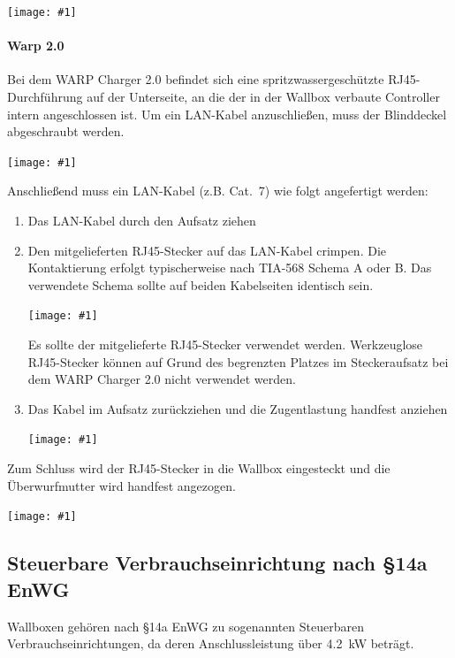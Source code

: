 \documentclass[a4paper,10pt]{article}
\newcommand{\hint}[1]{\begin{tcolorbox}[colback=boxgray,colframe=black,coltext=
white,title=Hinweis,left*=2mm,right*=2mm,boxsep=1mm,bottom=1mm,top=1mm]#1\end{tcolorbox}}
\newcommand{\gfx}[1]{\texttt{[image: \#1]}}
\begin{document}
\begin{multicols*}{2}
    \gfx{./img_warp2/resized/warp2_1_top_ready_1000.jpg} %

    \paragraph{Warp 2.0}

    Bei dem WARP Charger 2.0 befindet sich eine spritzwassergeschützte
    RJ45-Durchführung auf der Unterseite, an die der in der Wallbox verbaute Controller intern
    angeschlossen ist. Um ein LAN-Kabel anzuschließen, muss der Blinddeckel
    abgeschraubt werden.

    \gfx{./img_warp2/resized/warp2_ethernet3_circle_600} %

    Anschließend muss ein LAN-Kabel (z.B. Cat.~7) wie folgt
    angefertigt werden:

    \columnbreak

    \begin{enumerate}
        \item Das LAN-Kabel durch den Aufsatz ziehen
        \item Den mitgelieferten RJ45-Stecker auf das LAN-Kabel crimpen. Die
        Kontaktierung erfolgt typischerweise nach TIA-568 Schema A oder B.
        Das verwendete Schema sollte auf beiden Kabelseiten identisch sein.

        \gfx{./img_warp2/resized/warp2_rj45_1_600}
        \hint{Es sollte der mitgelieferte RJ45-Stecker verwendet werden. Werkzeuglose RJ45-Stecker können auf Grund des begrenzten
        Platzes im Steckeraufsatz bei dem WARP Charger 2.0 nicht verwendet werden.}

        \item Das Kabel im Aufsatz zurückziehen und die Zugentlastung handfest anziehen

        \gfx{./img_warp2/resized/warp2_rj45_2_600}
    \end{enumerate}

    Zum Schluss wird der RJ45-Stecker in die Wallbox eingesteckt und die Überwurfmutter
    wird handfest angezogen.

    \gfx{./img_warp2/resized/warp2_ethernet4_600} %

    \subsection{Steuerbare Verbrauchseinrichtung nach \S14a EnWG}
    Wallboxen gehören nach \S14a EnWG zu sogenannten Steuerbaren
    Verbrauchseinrichtungen, da deren Anschlussleistung über \SI{4,2}{\kilo\watt} beträgt.


\end{multicols*}
\end{document}
